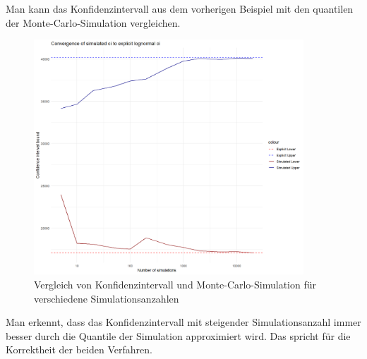 \begin{bsp}

Man kann das Konfidenzintervall aus dem vorherigen Beispiel mit den quantilen der Monte-Carlo-Simulation vergleichen.

\begin{figure}[H]
    \centering
    \includegraphics[width=0.9\textwidth]{images/ci_comparison.png}
    \caption{Vergleich von Konfidenzintervall und Monte-Carlo-Simulation für verschiedene Simulationsanzahlen}
    \label{fig:ci_comparison}
\end{figure}
Man erkennt, dass das Konfidenzintervall mit steigender Simulationsanzahl immer besser durch die Quantile der Simulation approximiert wird.
Das spricht für die Korrektheit der beiden Verfahren.

\end{bsp}